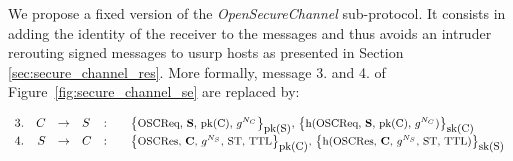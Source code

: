 We propose a fixed version of the {\em OpenSecureChannel} sub-protocol.
It consists in adding the identity of the receiver to the messages and thus 
avoids an intruder rerouting signed messages to usurp hosts as presented
in Section \ref{sec:secure_channel_res}.
More formally, message 3. and 4. of Figure~\ref{fig:secure_channel_se} are replaced
by:

\arraycolsep=1.4pt
\begin{flushleft}
    \[\begin{array}{lrllll}
        3. & C & \rightarrow & S & : & \text{\small\sm{\oscreq, {\bf S}, pk(C), $g^{N_{C}}$}{pk(S)}{sk(C)}}\\
        4. & S & \rightarrow & C & : & \text{\small\sm{\oscres, {\bf C}, $g^{N_{S}}$, ST, TTL}{pk(C)}{sk(S)}}\\
    \end{array}\]
\end{flushleft}

%
%
%
%                
%                
%
%
%
%
%
%

